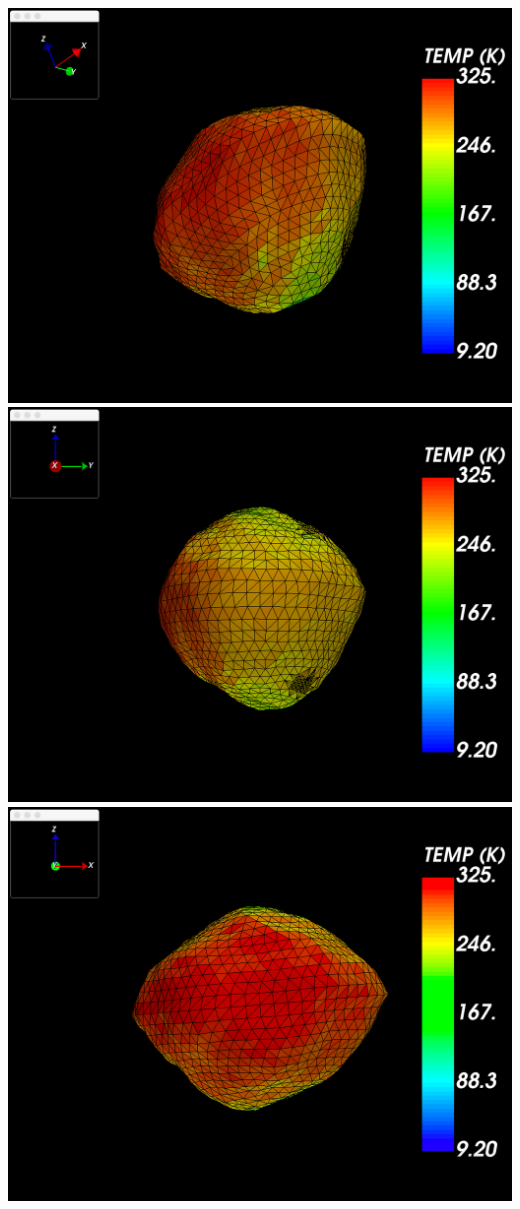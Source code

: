 \begin{center}
	\includegraphics[width=\linewidth]{rsc/HO3_3D_normalspeed}
	\includegraphics[width=\linewidth]{rsc/HO3_Xaxis_normalspeed}
	\includegraphics[width=\linewidth]{rsc/HO3_Yaxis_normalspeed}
\end{center}

